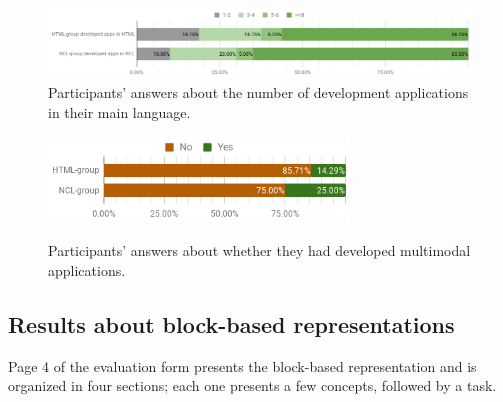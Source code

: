 \documentclass[
  doutorado,
  american
]{ThesisPUC}
\newcommand{\captionvspace}{\vspace{-1.3em}}
\begin{document}
\begin{figure}[!ht]
\begin{center}
	\includegraphics[width=14cm, keepaspectratio]{img/img18.png}
	\caption{Participants’ answers about the number of development applications 
	in their main language.}
	\label{fig:profile3}
    \captionvspace
\end{center}
\end{figure}


\begin{figure}[!ht]
\begin{center}
	\includegraphics[width=8cm, keepaspectratio]{img/img19.png}
	\caption{Participants’ answers about whether they had developed multimodal 
	applications.}
    \captionvspace
	\label{fig:profile4}
\end{center}
\end{figure}

\subsection{Results about block-based representations}
\label{sec:evaluation:blocks-res}

Page 4 of the evaluation form presents the block-based representation and is
organized in four sections; each one presents a few concepts, followed by a
task.
\end{document}
